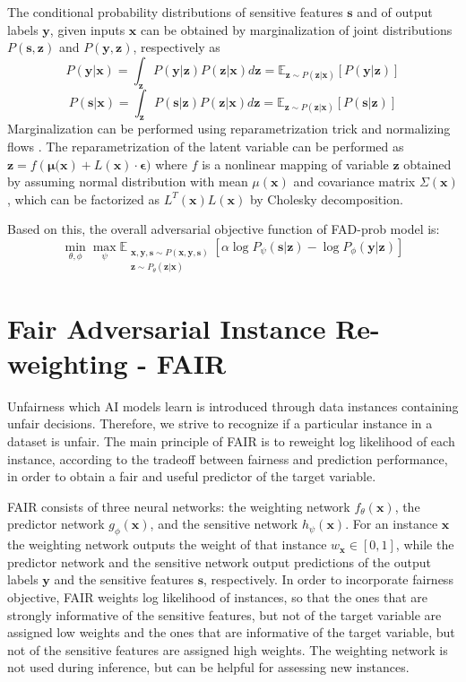 \documentclass[preprint,12pt]{elsarticle}
\begin{document}
The conditional probability distributions of sensitive features $\mathbf{s}$ and of output labels $\mathbf{y}$,  given inputs $\mathbf{x}$ can be obtained by marginalization of joint distributions $P(\mathbf{s},\mathbf{z})$ and $P(\mathbf{y},\mathbf{z})$, respectively as
$$ P(\mathbf{y}|\mathbf{x}) = \int_\mathbf{z} P(\mathbf{y}|\mathbf{z}) P(\mathbf{z}|\mathbf{x}) d\mathbf{z} = \mathbb{E}_{\mathbf{z} \sim P(\mathbf{z}|\mathbf{x})} [P(\mathbf{y}|\mathbf{z})]$$
$$ P(\mathbf{s}|\mathbf{x}) = \int_\mathbf{z} P(\mathbf{s}|\mathbf{z}) P(\mathbf{z}|\mathbf{x}) d\mathbf{z} = \mathbb{E}_{\mathbf{z} \sim P(\mathbf{z}|\mathbf{x})} [P(\mathbf{s}|\mathbf{z})]$$
Marginalization can be performed using reparametrization trick and normalizing flows \cite{kingma2019introduction}. The reparametrization of the latent variable can be performed as $\mathbf{z} = f(\mathbf{\mu(\mathbf{x}})+ L(\mathbf{x})\cdot \mathbf{\epsilon})$
where $f$ is a nonlinear mapping of variable $\mathbf{z}$ obtained by assuming normal distribution with mean $\mu(\mathbf{x})$ and covariance matrix $\Sigma(\mathbf{x})$, which can be factorized as $L^T(\mathbf{x})L(\mathbf{x})$ by Cholesky decomposition.

Based on this, the overall adversarial objective function of FAD-prob model is:
$$\min_{\theta,\phi}\max_{\psi}\mathbb{E}_{\substack{\mathbf{x},\mathbf{y}, \mathbf{s} \sim P(\mathbf{x},\mathbf{y},\mathbf{s})\\\mathbf{z} \sim P_\theta(\mathbf{z}|\mathbf{x})}} \left[\alpha \log P_{\psi}(\mathbf{s}|\mathbf{z})  - \log P_{\phi}(\mathbf{y}|\mathbf{z})\right]$$


\section{Fair Adversarial Instance Re-weighting - FAIR}
\label{Sec:FAIR}
Unfairness which AI models learn is introduced through data instances containing unfair decisions. Therefore, we strive to recognize if a particular instance in a dataset is unfair. The main principle of FAIR is to reweight log likelihood of each instance, according to the tradeoff between fairness and prediction performance, in order to obtain a fair and useful predictor of the target variable.

FAIR consists of three neural networks: the weighting network $f_\theta(\mathbf{x})$, the predictor network $g_\phi(\mathbf{x})$, and the sensitive network $h_\psi(\mathbf{x})$.
For an instance $\mathbf{x}$ the weighting network outputs the weight of that instance $w_\mathbf{x}\in[0,1]$, while the predictor network and the sensitive network output predictions of the output labels $\mathbf{y}$ and the sensitive features $\mathbf{s}$, respectively. In order to incorporate fairness objective, FAIR weights log likelihood of instances, so that the ones that are strongly informative of the sensitive features, but not of the target variable are assigned low weights and the ones that are informative of the target variable, but not of the sensitive features are assigned high weights.
The weighting network is not used during inference, but can be helpful for assessing new instances.
\end{document}
